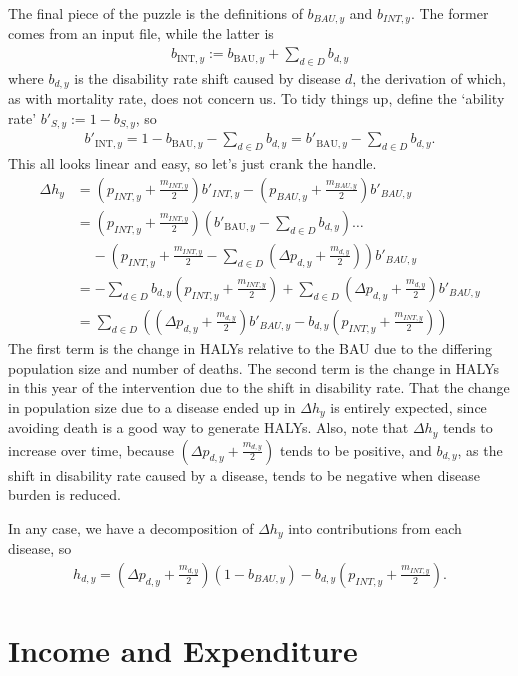 \documentclass[]{article}
\begin{document}
The final piece of the puzzle is the definitions of $b_{BAU, y}$ and $b_{INT, y}$. The former comes from an input file, while the latter is
\begin{align*}
	b_{\text{INT}, y} := b_{\text{BAU}, y} + \sum_{d \in D} b_{d, y}
\end{align*}
where $b_{d, y}$ is the disability rate shift caused by disease $d$, the derivation of which, as with mortality rate, does not concern us. To tidy things up, define the `ability rate' $b'_{S, y} := 1 - b_{S, y}$, so 
\begin{align*}
	b'_{\text{INT}, y} = 1 -  b_{\text{BAU}, y} - \sum_{d \in D} b_{d, y} = b'_{\text{BAU}, y} - \sum_{d \in D} b_{d, y}.
\end{align*}
This all looks linear and easy, so let's just crank the handle.
\begin{align*}
	\Delta h_y &= \left(p_{INT, y} + \frac{m_{INT, y}}{2}\right)b'_{INT, y} - \left(p_{BAU, y} + \frac{m_{BAU, y}}{2}\right) b'_{BAU, y} \\
	&= \left(p_{INT, y} + \frac{m_{INT, y}}{2}\right) \left(b'_{\text{BAU}, y} - \sum_{d \in D} b_{d, y}\right) \ldots  \\
	&\;\;\;\; - \left(p_{INT, y} + \frac{m_{INT, y}}{2} - \sum_{d \in D} \left(\Delta p_{d, y} + \frac{m_{d, y}}{2}\right)\right)b'_{BAU, y} \\
	&= - \sum_{d \in D} b_{d, y}\left(p_{INT, y} + \frac{m_{INT, y}}{2}\right) + \sum_{d \in D} \left(\Delta p_{d, y} + \frac{m_{d, y}}{2}\right)b'_{BAU, y} \\
	&= \sum_{d \in D} \left(\left(\Delta p_{d, y} + \frac{m_{d, y}}{2}\right)b'_{BAU, y} - b_{d, y}\left(p_{INT, y} + \frac{m_{INT, y}}{2}\right)\right)
\end{align*}
The first term is the change in HALYs relative to the BAU due to the differing population size and number of deaths. The second term is the change in HALYs in this year of the intervention due to the shift in disability rate. That the change in population size due to a disease ended up in $\Delta h_y$ is entirely expected, since avoiding death is a good way to generate HALYs. Also, note that $\Delta h_y$ tends to increase over time, because $\left(\Delta p_{d, y} + \frac{m_{d, y}}{2}\right)$ tends to be positive, and $b_{d, y}$, as the shift in disability rate caused by a disease, tends to be negative when disease burden is reduced.

In any case, we have a decomposition of $\Delta h_y$ into contributions from each disease, so
\begin{align*}
	h_{d, y} = \left(\Delta p_{d, y} + \frac{m_{d, y}}{2}\right)(1 - b_{BAU, y}) - b_{d, y}\left(p_{INT, y} + \frac{m_{INT, y}}{2}\right).
\end{align*}

\section{Income and Expenditure}
\end{document}
